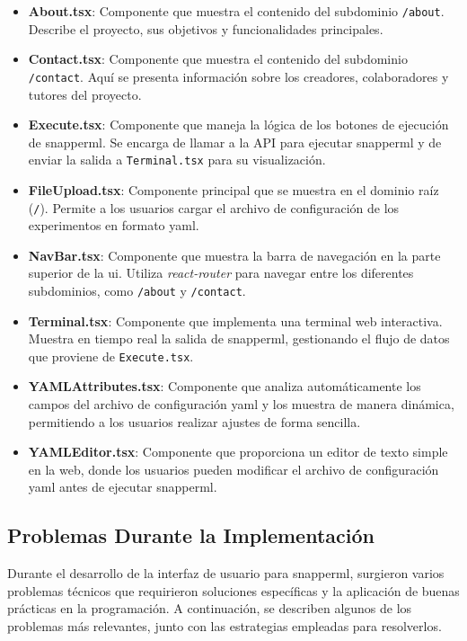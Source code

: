 \begin{itemize}
    \item \textbf{About.tsx}: Componente que muestra el contenido del subdominio \texttt{/about}. Describe el proyecto, sus objetivos y funcionalidades principales.
    \item \textbf{Contact.tsx}: Componente que muestra el contenido del subdominio \texttt{/contact}. Aquí se presenta información sobre los creadores, colaboradores y tutores del proyecto.
    \item \textbf{Execute.tsx}: Componente que maneja la lógica de los botones de ejecución de \Gls{snapperml}. Se encarga de llamar a la API para ejecutar \Gls{snapperml} y de enviar la salida a \texttt{Terminal.tsx} para su visualización.
    \item \textbf{FileUpload.tsx}: Componente principal que se muestra en el dominio raíz (\texttt{/}). Permite a los usuarios cargar el archivo de configuración de los experimentos en formato \acrshort{yaml}.
    \item \textbf{NavBar.tsx}: Componente que muestra la barra de navegación en la parte superior de la \acrshort{ui}. Utiliza \textit{react-router} para navegar entre los diferentes subdominios, como \texttt{/about} y \texttt{/contact}.
    \item \textbf{Terminal.tsx}: Componente que implementa una terminal web interactiva. Muestra en tiempo real la salida de \Gls{snapperml}, gestionando el flujo de datos que proviene de \texttt{Execute.tsx}. \item \textbf{YAMLAttributes.tsx}: Componente que analiza automáticamente los campos del archivo de configuración \acrshort{yaml} y los muestra de manera dinámica, permitiendo a los usuarios realizar ajustes de forma sencilla.
    \item \textbf{YAMLEditor.tsx}: Componente que proporciona un editor de texto simple en la web, donde los usuarios pueden modificar el archivo de configuración \acrshort{yaml} antes de ejecutar \Gls{snapperml}.
\end{itemize}

\subsection{Problemas Durante la Implementación}
Durante el desarrollo de la interfaz de usuario para \Gls{snapperml}, surgieron varios problemas técnicos que requirieron soluciones específicas y la aplicación de buenas prácticas en la programación. A continuación, se describen algunos de los problemas más relevantes, junto con las estrategias empleadas para resolverlos.

